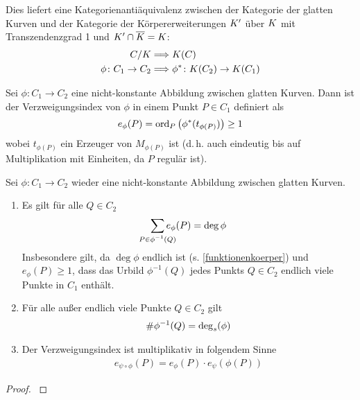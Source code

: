 \begin{Korollar}[Kategorienäquivalenz]\label{kategorienaequivalenz}
  Dies liefert eine Kategorienantiäquivalenz zwischen der Kategorie der
  glatten Kurven und der Kategorie der Körpererweiterungen $K'$ über $K$
  mit Transzendenzgrad 1 und $K'\cap\overline K=K$:
  \begin{align*}
    C/K &\Longrightarrow K(C)\\
    \phi\colon C_1\to C_2 &\Longrightarrow \phi^*\colon K(C_2)\to K(C_1)
  \end{align*}
\end{Korollar}

\begin{Definition}[Verzweigungsindex]
  Sei $\phi\colon C_1\to C_2$ eine nicht-konstante Abbildung zwischen
  glatten Kurven.
  Dann ist der Verzweigungsindex von $\phi$ in einem Punkt
  $P\in C_1$ definiert als
  \begin{gather*}
    e_\phi(P) = \operatorname{ord}_P \left( \phi^*(t_{\phi(P)}) \right) \geq 1
  \end{gather*}
  wobei $t_{\phi(P)}$ ein Erzeuger von $M_{\phi(P)}$ ist (d.\,h. auch
  eindeutig bis auf Multiplikation mit Einheiten, da $P$ regulär ist).
\end{Definition}

\begin{Satz}\label{sepgrad}
  Sei $\phi\colon C_1\to C_2$ wieder eine nicht-konstante Abbildung
  zwischen glatten Kurven. 
  \begin{enumerate}[label=\roman*)]
    \item Es gilt für alle $Q\in C_2$
      \begin{gather*}
        \sum_{\mathclap{P\in\phi^{-1}(Q)}} e_\phi(P) = \deg\phi
      \end{gather*}
      Insbesondere gilt, da $\deg\phi$ endlich ist
      (s. \ref{funktionenkoerper}) und $e_\phi(P)\geq 1$,
      dass das Urbild $\phi^{-1}(Q)$ jedes Punkts $Q\in C_2$
      endlich viele Punkte in $C_1$ enthält.
    \item Für alle außer endlich viele Punkte $Q\in C_2$ gilt
      \begin{gather*}
        \#\phi^{-1}(Q) = \operatorname{\deg}_s(\phi)
      \end{gather*}
    \item Der Verzweigungsindex ist multiplikativ
      in folgendem Sinne
      \begin{gather*}
        e_{\psi\circ\phi}(P) = e_\phi(P) \cdot e_\psi(\phi(P))
      \end{gather*}
    \end{enumerate}
    \begin{proof}
      \cite[siehe][Proposition II.2.6]{silverman}
    \end{proof}
\end{Satz}

